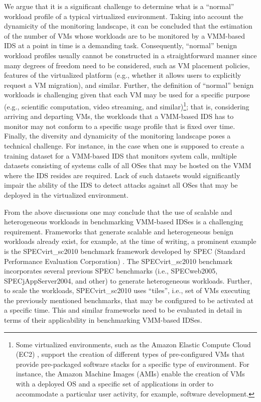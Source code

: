  We argue that it is a significant challenge to determine what is a ``normal'' workload profile of a typical virtualized environment. Taking into account the dynamicity of the monitoring landscape, it can be concluded that the estimation of the number of VMs whose workloads are to be monitored by a VMM-based IDS at a point in time is a demanding task. Consequently, ``normal'' benign workload profiles usually cannot be constructed in a straightforward manner since many degrees of freedom need to be considered, such as VM placement policies, features of the virtualized platform (e.g., whether it allows users to explicitly request a VM migration), and similar. Further, the definition of ``normal'' benign workloads is challenging given that each VM may be used for a specific purpose (e.g., scientific computation, video streaming, and similar)\footnote{Some virtualized environments, such as the Amazon Elastic Compute Cloud (EC2) \cite{AmazonEC2}, support the creation of different types of pre-configured VMs that provide pre-packaged software stacks for a specific type of environment.
For instance, the Amazon Machine Images (AMIs) enable the creation of VMs with a deployed OS and a specific set of applications in order to accommodate a particular user activity, for example, software development.}; that is, considering arriving and departing VMs, the workloads that a VMM-based IDS has to monitor may not conform to a specific usage profile that is fixed over time. Finally, the diversity and dynamicity of the monitoring landscape poses a technical challenge. For instance, in the case when one is supposed to create a training dataset for a VMM-based IDS that monitors system calls, multiple datasets consisting of systems calls
of all OSes that may be hosted on the VMM where the IDS resides are required. Lack of such datasets would significantly impair the ability of the IDS to detect attacks against all OSes that may be deployed in the virtualized environment. 

From the above discussions one may conclude that the use of scalable and heterogeneous workloads in benchmarking VMM-based IDSes is a challenging requirement. Frameworks that generate scalable and heterogeneous benign workloads already exist, for example, at the time of writing, a prominent example is the SPECvirt\_sc2010 benchmark framework developed by SPEC (Standard Performance Evaluation Corporation) \cite{specvirt}. The SPECvirt\_sc2010 benchmark incorporates several previous SPEC benchmarks (i.e., SPECweb2005, SPECjAppServer2004, and other) to generate heterogeneous workloads. Further, to scale the workloads, SPECvirt\_sc2010 uses ``tiles'', i.e., set of VMs executing the previously mentioned benchmarks, that may be configured to be activated at a specific time. This and similar frameworks need to be evaluated in detail in terms of their applicability in benchmarking VMM-based IDSes.


